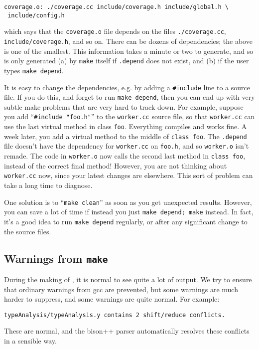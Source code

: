 {\begin{verbatim}
coverage.o: ./coverage.cc include/coverage.h include/global.h \
 include/config.h
\end{verbatim}

which says that the \verb!coverage.o! file depends on the files
\verb!./coverage.cc!, \verb!include/coverage.h!, and so on. There can be
dozens of dependencies; the above is one of the smallest. This information
takes a minute or two to generate, and so is only generated (a) by \verb!make!
itself if 
\verb!.depend! does not exist, and (b) if the user types \verb!make depend!.

It is easy to change the dependencies, e.g. by adding a
\verb!#include! line to a source file. If you do this, and forget to run
\verb!make depend!, then you can end up with very subtle make problems that
are very hard to track down. For example, suppose you add
``\verb!#include "foo.h"!'' to the \verb!worker.cc! source file,
so that \verb!worker.cc! can use the last virtual method in class \verb!foo!.
Everything compiles and works fine. A week later, you add a virtual method to
the middle of \verb!class foo!. The \verb!.depend! file doesn't have the
dependency for \verb!worker.cc! on \verb!foo.h!, and so \verb!worker.o! isn't
remade. The code in \verb!worker.o! now calls the second last method
in \verb!class foo!, instead of the correct final method! However,
you are not thinking about \verb!worker.cc! now, since your latest changes
are elsewhere. This sort of problem can take a long time to diagnose.

One solution is to ``\verb!make clean!'' as soon as you get unexpected
results. However, you can save a lot of time if instead you just
\verb!make depend; make! instead. In fact, it's a good idea to run
\verb!make depend! regularly, or after any significant change to the source
files.

\subsection{Warnings from \texttt{make}}

During the making of \walk, it is normal to see quite a lot of output. We try to
ensure that ordinary warnings from gcc are prevented, but some warnings are much
harder to suppress, and some warnings are quite normal. For example:

\verb!typeAnalysis/typeAnalysis.y contains 2 shift/reduce conflicts.!

These are normal, and the bison++ parser automatically resolves these conflicts
in a sensible way.


}

